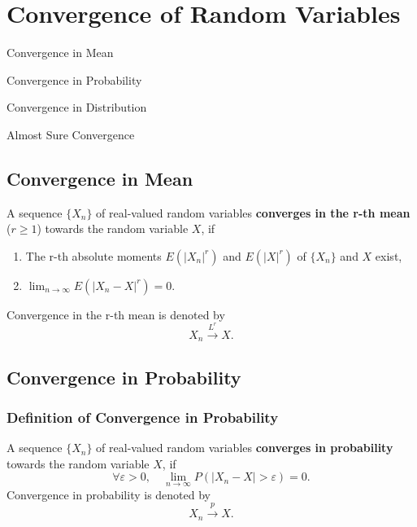 \chapter{Convergence of Random Variables}

\begin{introduction}
    \item Convergence in Mean
    \item Convergence in Probability
    \item Convergence in Distribution
    \item Almost Sure Convergence
\end{introduction}

\section{Convergence in Mean}

\begin{definition}
    A sequence $\{X_n\}$ of real-valued random variables \textbf{converges in the r-th mean} ($r\geq1$) towards the random variable $X$, if
    \begin{enumerate}
        \item The r-th absolute moments $E(|X_n|^r)$ and $E(|X|^r)$ of $\{X_n\}$ and $X$ exist,
        \item $\lim_{n\to\infty}E\left(|X_n-X|^r\right)=0$.
    \end{enumerate}
    Convergence in the r-th mean is denoted by
    \begin{equation}
        X_n \stackrel{L^r}{\rightarrow} X.
    \end{equation}
\end{definition}

\section{Convergence in Probability}

\subsection{Definition of Convergence in Probability}

\begin{definition}
    A sequence $\{X_n\}$ of real-valued random variables \textbf{converges in probability} towards the random variable $X$, if
    \begin{equation}
        \forall\varepsilon>0,\quad\lim_{n\to\infty}P\left(|X_n-X|>\varepsilon\right)=0.
    \end{equation}
    Convergence in probability is denoted by
    \begin{equation}
        X_n \stackrel{p}{\rightarrow} X.
    \end{equation}
\end{definition}

